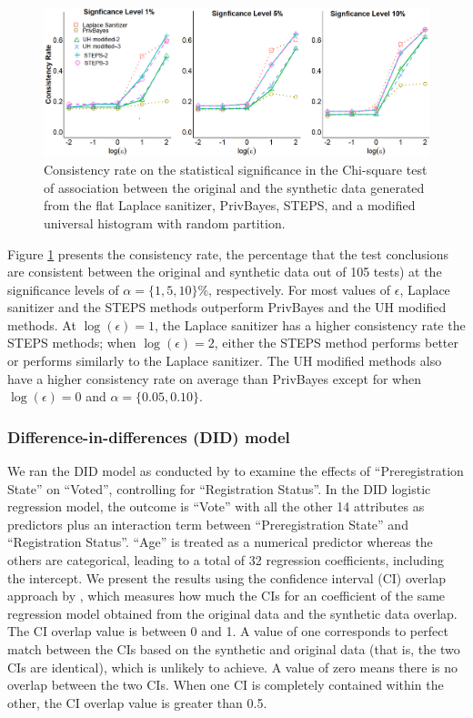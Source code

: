 \documentclass[12pt, A4]{article}
\theoremstyle{plain}
\theoremstyle{exampstyle}\newtheorem{defn}{Definition}
\theoremstyle{exampstyle}\newtheorem{lem}{Lemma}
\theoremstyle{exampstyle}\newtheorem{cor}{Corollary}
\theoremstyle{exampstyle}\newtheorem{pro}{Proposition}
\theoremstyle{exampstyle}\newtheorem{cla}{Claim}
\theoremstyle{exampstyle}\newtheorem{rem}{Remark}
\begin{document}
\begin{figure}[!htb]
\centerline{\includegraphics[width=6in]{accuracy2.png}}\vspace{-6pt}
\caption{Consistency rate on the statistical significance in the Chi-square test of association between the original and the synthetic data generated from the flat Laplace sanitizer, PrivBayes, STEPS, and a modified universal histogram with random partition.} \label{fig:chisq}\vspace{-6pt}
\end{figure}

Figure \ref{fig:chisq} presents the consistency rate, the percentage that the test conclusions are consistent between the original and synthetic data out of 105 tests) at the significance levels of $\alpha=\{1, 5, 10\}\%$, respectively. For most values of $\epsilon$, Laplace sanitizer and the STEPS methods outperform PrivBayes and the UH modified methods. At $\log(\epsilon) = 1$, the Laplace sanitizer has a higher consistency rate the STEPS methods; when $\log(\epsilon) = 2$, either the STEPS method performs better or performs similarly to the Laplace sanitizer. The UH modified methods also have a higher consistency rate on average than PrivBayes except for when $\log(\epsilon) = 0$ and $\alpha=\{0.05,0.10\}$.

\subsubsection{Difference-in-differences (DID) model}\label{sec:did}
We ran the DID model as conducted by \citet{Holbein2016} to examine the effects of ``Preregistration State'' on ``Voted'', controlling for ``Registration Status''. In the DID logistic regression model, the outcome is ``Vote'' with all the other 14 attributes as predictors plus an interaction term between ``Preregistration State'' and ``Registration Status''. ``Age'' is treated  as a numerical predictor whereas the others are categorical, leading to a total of 32 regression coefficients, including the intercept. We present the results using the confidence interval (CI) overlap approach by \citet{karr2006framework}, which measures how much the CIs for an coefficient of the same regression model obtained from the original data and the synthetic data overlap. The CI overlap value is between 0 and 1. A value of one corresponds to perfect match between the CIs based on the synthetic and original data (that is, the two CIs are identical), which is unlikely to achieve. A value of zero means there is no overlap between the two CIs. When one CI is completely contained within the other, the CI overlap value is greater than 0.5.
\end{document}
